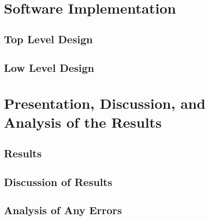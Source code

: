 \documentclass[12pt]{article} %
\begin{document}
\section{Software Implementation}\label{swImplementation}
%
%

\subsection{Top Level Design}\label{swTopLevel} %
%

\subsection{Low Level Design}\label{swLowLevel} %
%

\section{Presentation, Discussion, and Analysis of the Results}
%
%
\subsection{Results } %

\subsection{Discussion of Results } %

\subsection{Analysis of Any Errors } %
%
\end{document}
